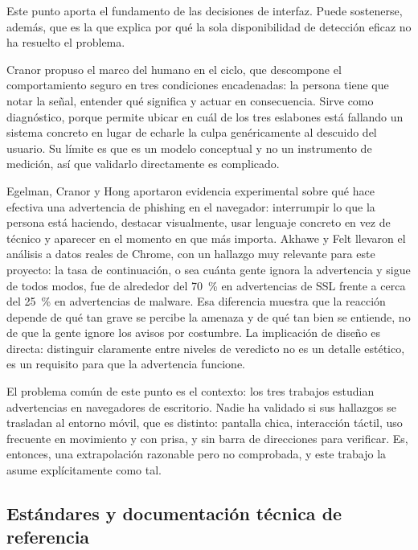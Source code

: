 Este punto aporta el fundamento de las decisiones de interfaz. Puede sostenerse,
además, que es la que explica por qué la sola disponibilidad de detección eficaz no ha
resuelto el problema.

Cranor \cite{cranor2008framework} propuso el marco del humano en el ciclo, que
descompone el comportamiento seguro en tres condiciones encadenadas: la persona tiene
que notar la señal, entender qué significa y actuar en consecuencia. Sirve como
diagnóstico, porque permite ubicar en cuál de los tres eslabones está fallando un
sistema concreto en lugar de echarle la culpa genéricamente al descuido del usuario. Su
límite es que es un modelo conceptual y no un instrumento de medición, así que
validarlo directamente es complicado.

Egelman, Cranor y Hong \cite{egelman2008warned} aportaron evidencia experimental
sobre qué hace efectiva una advertencia de phishing en el navegador: interrumpir lo que
la persona está haciendo, destacar visualmente, usar lenguaje concreto en vez de
técnico y aparecer en el momento en que más importa. Akhawe y Felt
\cite{akhawe2013alice} llevaron el análisis a datos reales de Chrome, con un hallazgo
muy relevante para este proyecto: la tasa de continuación, o sea cuánta gente ignora la
advertencia y sigue de todos modos, fue de alrededor del 70~\% en advertencias de SSL
frente a cerca del 25~\% en advertencias de malware. Esa diferencia muestra que la
reacción depende de qué tan grave se percibe la amenaza y de qué tan bien se entiende,
no de que la gente ignore los avisos por costumbre. La implicación de diseño es
directa: distinguir claramente entre niveles de veredicto no es un detalle estético,
es un requisito para que la advertencia funcione.

El problema común de este punto es el contexto: los tres trabajos estudian
advertencias en navegadores de escritorio. Nadie ha validado si sus hallazgos se
trasladan al entorno móvil, que es distinto: pantalla chica, interacción táctil, uso
frecuente en movimiento y con prisa, y sin barra de direcciones para verificar. Es,
entonces, una extrapolación razonable pero no comprobada, y este trabajo la asume
explícitamente como tal.

\subsection{Estándares y documentación técnica de referencia}

